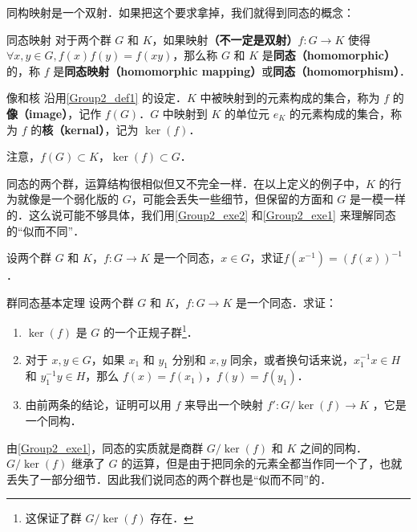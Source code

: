 同构映射是一个双射．如果把这个要求拿掉，我们就得到同态的概念：

\begin{definition}{同态映射}\label{Group2_def1}
对于两个群 $G$ 和 $K$，如果映射\textbf{（不一定是双射）}$f:G\rightarrow K$ 使得 $\forall x, y\in G, f(x)f(y)=f(xy)$，那么称 $G$ 和 $K$ 是\textbf{同态（homomorphic）}的，称 $f$ 是\textbf{同态映射（homomorphic mapping）}或\textbf{同态（homomorphism）}．
\end{definition}

\begin{definition}{像和核}
沿用\autoref{Group2_def1} 的设定．$K$ 中被映射到的元素构成的集合，称为 $f$ 的\textbf{像（image）}，记作 $f(G)$．$G$ 中映射到 $K$ 的单位元 $e_K$ 的元素构成的集合，称为 $f$ 的\textbf{核（kernal）}，记为 $\ker(f)$．
\end{definition}

注意，$f(G)\subset K$，$\ker(f)\subset G$．

同态的两个群，运算结构很相似但又不完全一样．在以上定义的例子中，$K$ 的行为就像是一个弱化版的 $G$，可能会丢失一些细节，但保留的方面和 $G$ 是一模一样的．这么说可能不够具体，我们用\autoref{Group2_exe2} 和\autoref{Group2_exe1} 来理解同态的“似而不同”．


\begin{exercise}{}\label{Group2_exe2}
设两个群 $G$ 和 $K$，$f:G\rightarrow K$ 是一个同态，$x\in G$，求证$f(x^{-1})=(f(x))^{-1}$．
\end{exercise}


\begin{exercise}{群同态基本定理}\label{Group2_exe1}
设两个群 $G$ 和 $K$，$f:G\rightarrow K$ 是一个同态．求证：
\begin{enumerate}
\item $\ker(f)$ 是 $G$ 的一个正规子群\footnote{这保证了群 $G/\ker(f)$ 存在．}．
\item 对于 $x, y\in G$，如果 $x_1$ 和 $y_1$ 分别和 $x, y$ 同余，或者换句话来说，$x_1^{-1}x\in H$ 和 $y_1^{-1}y\in H$，那么 $f(x)=f(x_1)$，$f(y)=f(y_1)$．
\item 由前两条的结论，证明可以用 $f$ 来导出一个映射 $f': G/\ker(f)\rightarrow K$ ，它是一个同构．

\end{enumerate}
\end{exercise}

由\autoref{Group2_exe1}，同态的实质就是商群 $G/\ker(f)$ 和 $K$ 之间的同构．$G/\ker(f)$ 继承了 $G$ 的运算，但是由于把同余的元素全都当作同一个了，也就丢失了一部分细节．因此我们说同态的两个群也是“似而不同”的．



